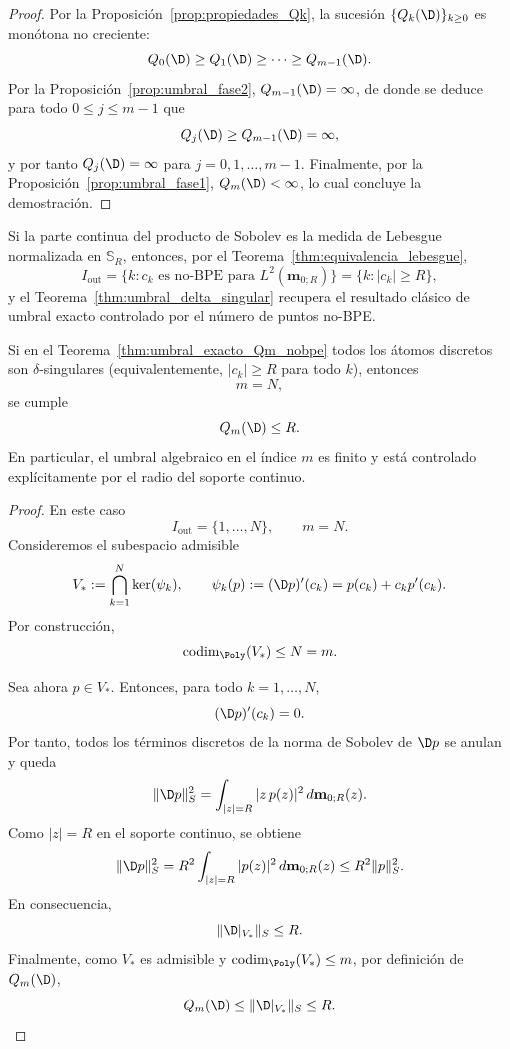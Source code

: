 \begin{proof}
	Por la Proposición~\ref{prop:propiedades_Qk}, la sucesión $\{Q_k(\D)\}_{k\ge0}$ es monótona no creciente:
	\[
		Q_0(\D)\ge Q_1(\D)\ge\cdots\ge Q_{m-1}(\D).
	\]
	Por la Proposición~\ref{prop:umbral_fase2}, $Q_{m-1}(\D)=\infty$, de donde se deduce para todo $0\le j\le m-1$ que
	\[
		Q_j(\D)\ge Q_{m-1}(\D)=\infty,
	\]
	y por tanto $Q_j(\D)=\infty$ para $j=0,1,\dots,m-1$. Finalmente, por la Proposición~\ref{prop:umbral_fase1}, $Q_m(\D)<\infty$, lo cual concluye la demostración.
\end{proof}

\begin{cor}\label{cor:lectura_BPE_lebesgue}
	Si la parte continua del producto de Sobolev es la medida de Lebesgue
	normalizada en $\mathbb{S}_R$, entonces, por el
	Teorema~\ref{thm:equivalencia_lebesgue},
	\[
		I_{\mathrm{out}}=\{k:c_k\text{ es no-BPE para }L^2(\mathbf m_{0;R})\}
		=\{k:|c_k|\ge R\},
	\]
	y el Teorema~\ref{thm:umbral_delta_singular} recupera el resultado
	clásico de umbral exacto controlado por el número de puntos no-BPE.
\end{cor}

\begin{cor}\label{cor:umbral_m_puramente_exterior}
	Si en el Teorema~\ref{thm:umbral_exacto_Qm_nobpe} todos los átomos discretos son $\delta$-singulares (equivalentemente, $|c_k|\ge R$ para todo $k$), entonces
	\[
		m=N,
	\]
	se cumple
	\[
		Q_m(\D)\le R.
	\]
	En particular, el umbral algebraico en el índice $m$ es finito y está controlado explícitamente por el radio del soporte continuo.
\end{cor}

\begin{proof}
	En este caso
	\[
		I_{\mathrm{out}}=\{1,\dots,N\},
		\qquad
		m=N.
	\]
	Consideremos el subespacio admisible
	\[
		V_*:=\bigcap_{k=1}^N \ker(\psi_k),
		\qquad
		\psi_k(p):=(\D p)'(c_k)=p(c_k)+c_kp'(c_k).
	\]
	Por construcción,
	\[
		\operatorname{codim}_{\Poly}(V_*)\le N=m.
	\]

	Sea ahora $p\in V_*$. Entonces, para todo $k=1,\dots,N$,
	\[
		(\D p)'(c_k)=0.
	\]
	Por tanto, todos los términos discretos de la norma de Sobolev de $\D p$ se anulan y queda
	\[
		\|\D p\|_S^2
		=
		\int_{|z|=R} |z\,p(z)|^2\,d\mathbf{m}_{0;R}(z).
	\]
	Como $|z|=R$ en el soporte continuo, se obtiene
	\[
		\|\D p\|_S^2
		=
		R^2\int_{|z|=R}|p(z)|^2\,d\mathbf{m}_{0;R}(z)
		\le
		R^2\|p\|_S^2.
	\]
	En consecuencia,
	\[
		\|\D|_{V_*}\|_S\le R.
	\]
	Finalmente, como $V_*$ es admisible y $\operatorname{codim}_{\Poly}(V_*)\le m$, por definición de $Q_m(\D)$,
	\[
		Q_m(\D)\le \|\D|_{V_*}\|_S\le R.
	\]
\end{proof}

